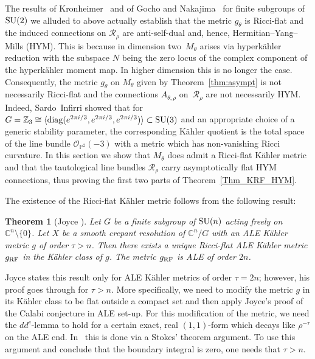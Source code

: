 \documentclass[pdftex]{sigma}
\numberwithin{equation}{section}
\newcommand{\cO}{\mathcal{O}}
\newcommand{\cR}{\mathcal{R}}
\newcommand{\Z}{{\mathbb Z}}
\newcommand{\C}{{\mathbb C}}
\newcommand{\SU}{{\rm SU}}
\renewcommand{\P}{{\mathbb P}}
\newcommand{\diag}{\operatorname{diag}}
\newcommand{\iso}{\cong}
\newcommand{\RF}{{\rm RF}}
\newtheorem{Theorem}{Theorem}[section]
\begin{document}
The results of Kronheimer~\cite{Kronheimer1989} and of Gocho and Nakajima~\cite{Gocho1992} for f\/inite subgroups of $\SU(2)$ we alluded to above actually establish that the metric $g_{\theta}$ is Ricci-f\/lat and the induced connections on $\cR_{\rho}$ are anti-self-dual and, hence, Hermitian--Yang--Mills (HYM).
This is because in dimension two~$M_\theta$ arises via hyperk\"ahler reduction with the subspace $N$ being the zero locus of the complex component of the hyperk\"ahler moment map.
In higher dimension this is no longer the case.
Consequently, the metric $g_\theta$ on $M_\theta$ given by
Theorem~\ref{thm:asympt} is not necessarily Ricci-f\/lat and the
connections $A_{\theta,\rho}$ on~$\cR_\rho$ are not necessarily HYM.
Indeed, Sardo~Inf\/irri \cite[Example~7.1]{SardoInfirri1996} showed
that for $G=\Z_3\iso\langle \diag(e^{2\pi i/3},e^{2\pi i/3},e^{2\pi
  i/3})\rangle \subset\SU(3)$ and an appropriate choice of a generic
stability parameter, the corresponding K\"ahler quotient is the total
space of the line bundle $\cO_{\P^2}(-3)$ with a metric which has
non-vanishing Ricci curvature.
In this section we show that $M_\theta$ does admit a Ricci-f\/lat
K\"ahler metric and that the tautological line bundles $\cR_\rho$ carry asymptotically f\/lat HYM
connections, thus proving the f\/irst two parts of Theorem~\ref{Thm_KRF_HYM}.

The existence of the Ricci-f\/lat K\"ahler metric follows from the
following result:

\begin{Theorem}[Joyce ]\label{thm:rf}
  Let $G$ be a finite subgroup of $\SU(n)$ acting freely on
  $\C^n{\setminus} \{0\}$.  Let $X$ be a smooth crepant resolution of
  $\C^n/G$ with an ALE K\"ahler metric $g$ of order $\tau>n$.  Then
  there exists a unique Ricci-flat ALE K\"ahler metric $g_\RF$ in the
  K\"ahler class of $g$.  The metric $g_\RF$ is ALE of order $2n$.
\end{Theorem}

\begin{Remark}
  Joyce states this result only for ALE K\"ahler metrics of order $\tau
  =2n$; however, his proof goes through for $\tau >n$. More specif\/ically, we need to modify the metric $g$ in its K\"ahler class to be f\/lat outside a compact set and then apply Joyce's proof of the Calabi conjecture in ALE set-up. For this modif\/ication of the metric, we need the $dd^c$-lemma to hold for a certain exact, real $(1,1)$-form which decays like $\rho^{-\tau}$ on the ALE end.
In~\cite[Theorem~8.4.4]{Joyce2000} this is done via a Stokes' theorem argument. To use this argument and conclude that the boundary integral is zero, one needs that $\tau > n$.
\end{Remark}
\end{document}

